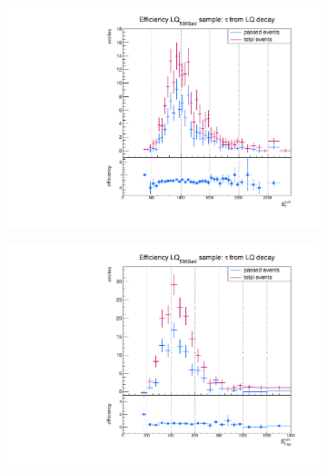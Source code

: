 \begin{figure}
  \centering    
                \begin{subfigure}[t]{0.49\textwidth}
                \includegraphics[width=\textwidth]{figures/plots/LQ75/Divided_fromLQST.pdf}
                \label{Dividedprompt:signal:STLQ75}
                \end{subfigure}
                \begin{subfigure}[t]{0.49\textwidth}
                \includegraphics[width=\textwidth]{figures/plots/LQ75/Divided_fromLQSTlep.pdf}

\end{subfigure}
\end{figure}
